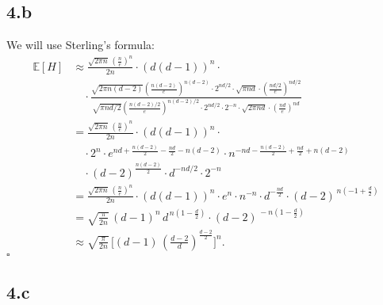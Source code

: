 \documentclass{article}
\begin{document}
\subsection*{4.b}
We will use Sterling's formula:
\begin{align*}
\mathbb{E}[H] 
&\approx \frac{\sqrt{2\pi n}\,\left(\tfrac{n}{e}\right)^n}{2n}
    \cdot (d(d-1))^n \cdot \\[6pt]
&\quad \cdot
    \frac{\sqrt{2\pi n(d-2)}\left(\tfrac{n(d-2)}{e}\right)^{n(d-2)} \cdot 2^{nd/2}\cdot\sqrt{\pi nd}\cdot\left(\tfrac{nd/2}{e}\right)^{nd/2}}
         {\sqrt{\pi nd/2}\left(\tfrac{n(d-2)/2}{e}\right)^{n(d-2)/2} \cdot 2^{nd/2}\cdot2^{-n}\cdot\sqrt{2\pi nd}\cdot\left(\tfrac{nd}{e}\right)^{nd}} \\[6pt]
&= \frac{\sqrt{2\pi n}\,\left(\tfrac{n}{e}\right)^n}{2n} \cdot (d(d-1))^n \cdot \\[6pt]
&\quad \cdot 2^n \cdot e^{nd + \tfrac{n(d-2)}{2} - \tfrac{nd}{2} - n(d-2)} \cdot
   n^{-nd - \tfrac{n(d-2)}{2} + \tfrac{nd}{2} + n(d-2)} \\
&\quad \cdot (d-2)^{\tfrac{n(d-2)}{2}} \cdot d^{-nd/2}\cdot 2^{-n} \\[6pt]
&= \frac{\sqrt{2\pi n}\,\left(\tfrac{n}{e}\right)^n}{2n} \cdot (d(d-1))^n\cdot e^n \cdot n^{-n}
    \cdot d^{-\tfrac{nd}{2}} \cdot (d-2)^{\,n(-1+\tfrac{d}{2})} \\[6pt]
&= \sqrt{\frac{\pi}{2n}} \,(d-1)^n \, d^{\,n(1-\tfrac{d}{2})} \cdot (d-2)^{\,-n(1-\tfrac{d}{2})} \\[6pt]
&\approx \sqrt{\frac{\pi}{2n}} \,\Big[(d-1)\,\left(\tfrac{d-2}{d}\right)^{\tfrac{d-2}{2}}\Big]^n.
\end{align*} \hfill $\square$

\subsection*{4.c}
\end{document}
